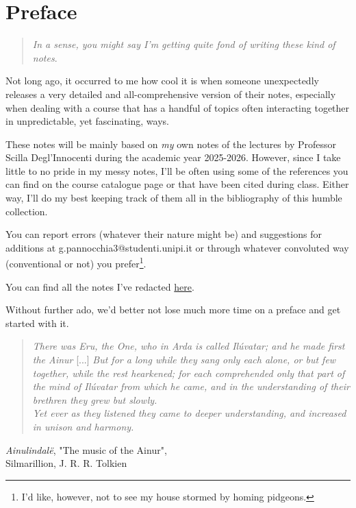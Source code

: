 \chapter*{Preface}

\begin{quote}
    \emph{In a sense, you might say I'm getting quite fond of writing these kind of notes}.
\end{quote}
Not long ago, it occurred to me how cool it is when someone unexpectedly releases a very detailed and all-comprehensive version of their notes, especially when dealing with a course that has a handful of topics often interacting together in unpredictable, yet fascinating, ways.
\par These notes will be mainly based on \emph{my} own notes of the lectures by Professor Scilla Degl'Innocenti during the academic year 2025-2026. However, since I take little to no pride in my messy notes, I'll be often using some of the references you can find on the course catalogue page or that have been cited during class. Either way, I'll do my best keeping track of them all in the bibliography of this humble collection.
\par You can report errors (whatever their nature might be) and suggestions for additions at g.pannocchia3@studenti.unipi.it or through whatever convoluted way (conventional or not) you prefer\footnote{I'd like, however, not to see my house stormed by homing pidgeons.}.
\par You can find all the notes I've redacted \href{https://github.com/gpannocchia3}{here}.
\par Without further ado, we'd better not lose much more time on a preface and get started with it.
\begin{quote}
    \emph{There was Eru, the One, who in Arda is called Ilúvatar; and he made first the Ainur} [...] \emph{But for a long while they sang only each alone, or but few together, while the rest hearkened; for each comprehended only that part of the mind of Ilúvatar from which he came, and in the understanding of their brethren they grew but slowly. \\
    Yet ever as they listened they came to deeper understanding, and increased in unison and harmony.}
\end{quote}

\begin{flushright}
    \emph{Ainulindalë}, "The music of the Ainur",\\
    Silmarillion, J. R. R. Tolkien
\end{flushright}